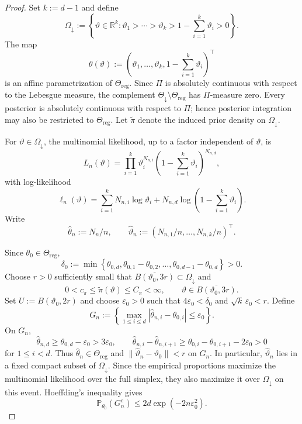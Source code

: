 \documentclass{article}
\theoremstyle{named}
\theoremstyle{named1}
\theoremstyle{plain}
\theoremstyle{remark}
\begin{document}
\begin{proof}
Set $k:=d-1$ and define
\[
    \Omega_{\downarrow}
    :=
    \left\{
        \vartheta\in\mathbb R^k:
        \vartheta_1>\cdots>\vartheta_k>
        1-\sum_{i=1}^k\vartheta_i>0
    \right\}.
\]
The map
\[
    \theta(\vartheta)
    :=
    \left(
        \vartheta_1,\ldots,\vartheta_k,
        1-\sum_{i=1}^k\vartheta_i
    \right)^\top
\]
is an affine parametrization of $\Theta_{\mathrm{reg}}$.
Since $\Pi$ is absolutely continuous with respect to the Lebesgue measure, the complement $\Theta_{\downarrow}\setminus\Theta_{\mathrm{reg}}$
has $\Pi$-measure zero. Every posterior is absolutely
continuous with respect to $\Pi$; hence posterior integration may also be
restricted to $\Theta_{\mathrm{reg}}$.
Let $\widetilde\pi$ denote the induced prior density on
$\Omega_{\downarrow}$.

For $\vartheta\in\Omega_{\downarrow}$, the multinomial likelihood, up to
a factor independent of $\vartheta$, is
\[
    L_n(\vartheta)
    =
    \prod_{i=1}^k\vartheta_i^{N_{n,i}}
    \left(1-\sum_{i=1}^k\vartheta_i\right)^{N_{n,d}},
\]
with log-likelihood
\[
    \ell_n(\vartheta)
    =
    \sum_{i=1}^kN_{n,i}\log\vartheta_i
    +N_{n,d}\log\left(1-\sum_{i=1}^k\vartheta_i\right).
\]
Write
\[
    \widehat\theta_n:=N_n/n,
    \qquad
    \widehat\vartheta_n
    :=(N_{n,1}/n,\ldots,N_{n,k}/n)^\top.
\]

Since $\theta_0\in\Theta_{\mathrm{reg}}$,
\[
    \delta_0
    :=
    \min\left\{
        \theta_{0,d},
        \theta_{0,1}-\theta_{0,2},\ldots,
        \theta_{0,d-1}-\theta_{0,d}
    \right\}>0.
\]
Choose $r>0$ sufficiently small that
$\overline{B(\vartheta_0,3r)}\subset\Omega_{\downarrow}$ and
\[
    0<c_\pi\leq\widetilde\pi(\vartheta)\leq C_\pi<\infty,
    \qquad
    \vartheta\in\overline{B(\vartheta_0,3r)}.
\]
Set $U:=B(\vartheta_0,2r)$ and choose $\varepsilon_0>0$ such that
$4\varepsilon_0<\delta_0$ and $\sqrt{k}\,\varepsilon_0<r$.
Define
\[
    G_n
    :=
    \left\{
        \max_{1\leq i\leq d}
        |\widehat\theta_{n,i}-\theta_{0,i}|
        \leq\varepsilon_0
    \right\}.
\]
On $G_n$,
\[
    \widehat\theta_{n,d}
    \geq\theta_{0,d}-\varepsilon_0>3\varepsilon_0,
    \qquad
    \widehat\theta_{n,i}-\widehat\theta_{n,i+1}
    \geq\theta_{0,i}-\theta_{0,i+1}-2\varepsilon_0>0
\]
for $1\leq i<d$. Thus $\widehat\theta_n\in\Theta_{\mathrm{reg}}$ and
$\|\widehat\vartheta_n-\vartheta_0\|<r$ on $G_n$. In particular,
$\widehat\vartheta_n$ lies in a fixed compact subset of
$\Omega_{\downarrow}$. Since the empirical proportions maximize the
multinomial likelihood over the full simplex, they also maximize it over
$\Omega_{\downarrow}$ on this event. Hoeffding's inequality gives
\begin{equation}
    \mathbb P_{\theta_0}(G_n^c)
    \leq2d\exp(-2n\varepsilon_0^2).
    \label{eq:good-event-probability}
\end{equation}


\end{proof}
\end{document}
